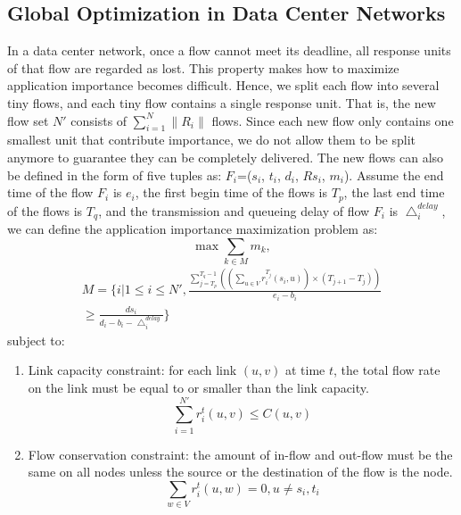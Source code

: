 \documentclass[conference]{IEEEtran}
\begin{document}
\subsection{Global Optimization in Data Center Networks}

In a data center network, once a flow cannot meet its deadline, all response units of that flow are regarded as lost. This property makes how to maximize application importance becomes difficult. Hence, we split each flow into several tiny flows, and each tiny flow contains a single response unit. That is, the new flow set $N'$ consists of $\sum_{i=1}^{N} \|R_{i}\|$ flows. Since each new flow only contains one smallest unit that contribute importance, we do not allow them to be split anymore to guarantee they can be completely delivered. The new flows can also be defined in the form of five tuples as: $F_{i}$=($s_{i}$, $t_{i}$, $d_{i}$, $Rs_{i}$, $m_{i}$). Assume the end time of the flow $F_{i}$ is $e_{i}$, the first begin time of the flows is $T_{p}$, the last end time of the flows is $T_{q}$, and the transmission and queueing delay of flow $F_{i}$ is $\bigtriangleup_{i}^{delay}$, we can define the application importance maximization problem as:
\begin{equation}
\max \sum_{k \in M} m_{k} ,
\label{eq:objective}
\end{equation}
\begin{equation}
\begin{split}
M = \{ i | 1 \leq i \leq N', \frac{ \sum_{j=T_{p}}^{T_{q}-1} (( \sum_{u \in V} r_{i}^{T_{j}} (s_{i}, u) ) \times (T_{j+1} - T_{j} ))} { e_{i} - b_{i} } \\
\geq \frac{ds_{i}}{d_{i} - b_{i} - \bigtriangleup_{i}^{delay} } \}
\label{eq:Mset}
\end{split}
\end{equation}
subject to:

\begin{enumerate}
\item Link capacity constraint: for each link $(u,v)$ at time $t$, the total flow rate on the link must be equal to or smaller than the link capacity.
\begin{equation}
\sum_{i=1}^{N'} r_{i}^{t} (u,v) \leq C(u,v)
\label{eq:capacity}
\end{equation}
\item Flow conservation constraint: the amount of in-flow and out-flow must be the same on all nodes unless the source or the destination of the flow is the node.
\begin{equation}
\sum_{w \in V} r_{i}^{t} (u,w) = 0 , u \neq s_{i}, t_{i}
\label{eq:conservation}
\end{equation}
\end{enumerate}
\end{document}
